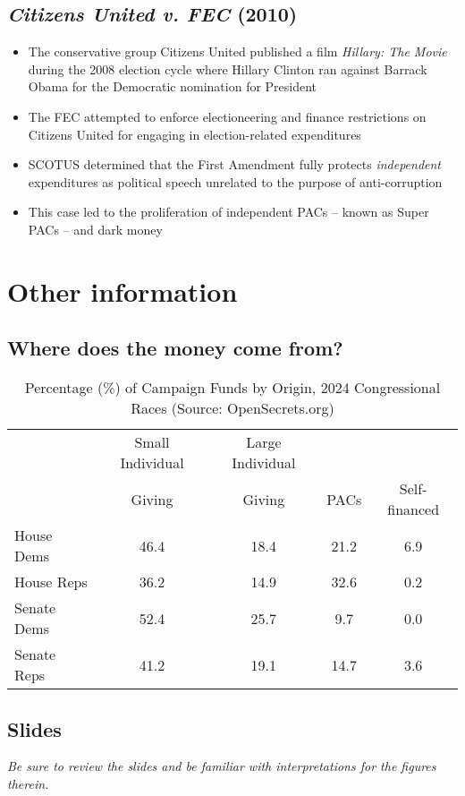 \documentclass[10pt]{article}
\begin{document}
	\subsection{\textit{Citizens United v. FEC} (2010)}
	\begin{itemize}
		\item The conservative group Citizens United published a film \textit{Hillary: The Movie} during the 2008 election cycle where Hillary Clinton ran against Barrack Obama for the Democratic nomination for President
		\item The FEC attempted to enforce electioneering and finance restrictions on Citizens United for engaging in election-related expenditures
		\item SCOTUS determined that the First Amendment fully protects \textit{independent} expenditures as political speech unrelated to the purpose of anti-corruption
		\item This case led to the proliferation of independent PACs -- known as Super PACs -- and dark money
	\end{itemize}
	
	
	\section{Other information}
	
	\subsection{Where does the money come from?}
	
	\begin{table}[h]
		\centering
		\begin{tabular}{lcccc}
			\toprule
			& Small Individual & Large Individual & &   \\
			& Giving           & Giving & PACs & Self-financed\\ \midrule
			House Dems & 46.4 & 18.4 & 21.2 & 6.9\\
			House Reps & 36.2 & 14.9 & 32.6 & 0.2\\
			Senate Dems & 52.4 & 25.7 & 9.7 & 0.0\\
			Senate Reps & 41.2 & 19.1 & 14.7& 3.6\\ \bottomrule
		\end{tabular}
		\caption{Percentage (\%) of Campaign Funds by Origin, 2024 Congressional Races (Source: OpenSecrets.org)}
	\end{table}
	
	\subsection{Slides}
	
	\textit{Be sure to review the slides and be familiar with interpretations for the figures therein.}
	
\end{document}
